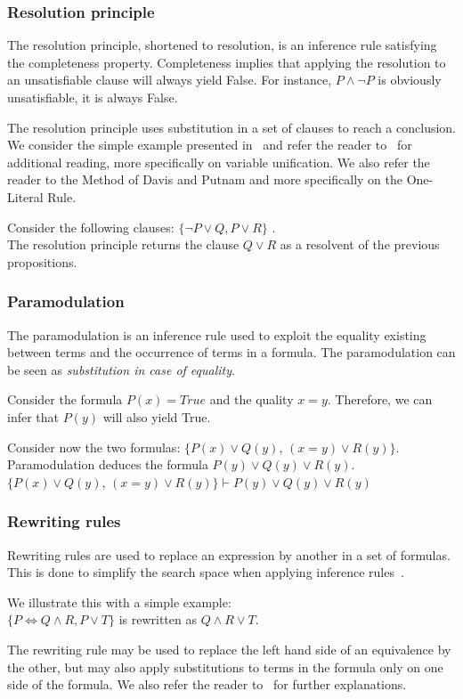 \subsubsection{Resolution principle}
The resolution principle, shortened to resolution, is an inference rule satisfying the completeness property. Completeness implies that applying the resolution to an unsatisfiable clause will always yield False. 
For instance, $P \wedge \neg P$ is obviously unsatisfiable, \ie it is always False.

The resolution principle uses substitution in a set of clauses to reach a conclusion.
We consider the simple example presented in~\cite{snark-Stickel2000} and refer the reader to~\cite{symbolic-proof} for additional reading, more specifically on variable unification.
We also refer the reader to the Method of Davis and Putnam and more specifically on the One-Literal Rule.

Consider the following clauses: $\{\neg P \vee Q,P \vee R\}$ .\\
The resolution principle returns the clause $Q \vee R$ as a resolvent of the previous propositions.

\subsubsection{Paramodulation}
The paramodulation is an inference rule used to exploit the equality existing between terms and the occurrence of terms in a formula. The paramodulation can be seen as \textit{substitution in case of equality}.

Consider the formula $P(x) = True$ and the quality $x=y$. Therefore, we can infer that $P(y)$ will also yield True.

Consider now the two formulas: $\{P(x) \vee Q(y)$, $(x = y) \vee R(y)\}$.\\
Paramodulation deduces the formula $P(y) \vee Q(y) \vee R(y)$.\\
$\{P(x) \vee Q(y)$, $(x = y) \vee R(y)\} \vdash P(y) \vee Q(y) \vee R(y)$

\subsubsection{Rewriting rules}
Rewriting rules are used to replace an expression by another in a set of formulas.
This is done to simplify the search space when applying inference rules~\cite{snark-Stickel2000}.

We illustrate this with a simple example:\\
$\{P \Leftrightarrow Q \wedge R, P \vee T\}$ is rewritten as $Q \wedge R \vee T$. 

The rewriting rule may be used to replace the left hand side of an equivalence by the other, but may also apply substitutions to terms in the formula only on one side of the formula.
We also refer the reader to~\cite{snark-Stickel2000,symbolic-proof} for further explanations.
